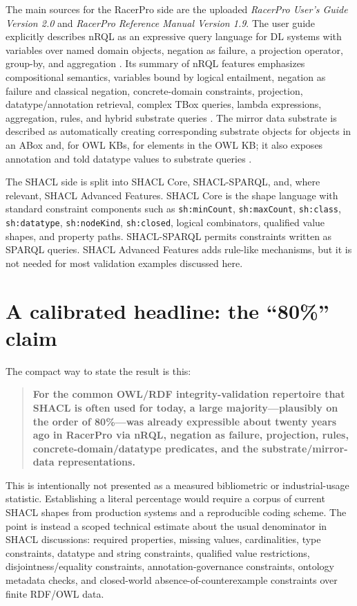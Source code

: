 \documentclass[11pt,letterpaper]{article}
\newcommand{\nrql}{nRQL}
\newcommand{\racer}{RacerPro}
\newcommand{\shacl}{SHACL}
\newcommand{\naf}{negation as failure}
\newcommand{\abox}{ABox}
\newcommand{\tbox}{TBox}
\newcommand{\owl}{OWL}
\begin{document}
The main sources for the \racer{} side are the uploaded \emph{RacerPro User's Guide Version 2.0} and \emph{RacerPro Reference Manual Version 1.9}. The user guide explicitly describes \nrql{} as an expressive query language for DL systems with variables over named domain objects, \naf{}, a projection operator, group-by, and aggregation \cite[p.~4]{racerug}. Its summary of \nrql{} features emphasizes compositional semantics, variables bound by logical entailment, \naf{} and classical negation, concrete-domain constraints, projection, datatype/annotation retrieval, complex \tbox{} queries, lambda expressions, aggregation, rules, and hybrid substrate queries \cite[pp.~81--84]{racerug}. The mirror data substrate is described as automatically creating corresponding substrate objects for objects in an \abox{} and, for \owl{} KBs, for elements in the \owl{} KB; it also exposes annotation and told datatype values to substrate queries \cite[pp.~137--143]{racerug}.

The \shacl{} side is split into \shacl{} Core, \shacl{}-SPARQL, and, where relevant, \shacl{} Advanced Features. \shacl{} Core is the shape language with standard constraint components such as \texttt{sh:minCount}, \texttt{sh:maxCount}, \texttt{sh:class}, \texttt{sh:datatype}, \texttt{sh:nodeKind}, \texttt{sh:closed}, logical combinators, qualified value shapes, and property paths. \shacl{}-SPARQL permits constraints written as SPARQL queries. \shacl{} Advanced Features adds rule-like mechanisms, but it is not needed for most validation examples discussed here.


\section{A calibrated headline: the ``80\%'' claim}\label{sec:calibrated-headline}

The compact way to state the result is this:

\begin{quote}
\textbf{For the common OWL/RDF integrity-validation repertoire that 
SHACL is often used for today, a large majority---plausibly on the order of 80\%---was already expressible about twenty years ago in RacerPro via 
\nrql{}, \naf{}, projection, rules, concrete-domain/datatype predicates, and the substrate/mirror-data representations.}
\end{quote}

This is intentionally not presented as a measured bibliometric or industrial-usage statistic. Establishing a literal percentage would require a corpus of current SHACL shapes from production systems and a reproducible coding scheme. The point is instead a scoped technical estimate about the usual denominator in SHACL discussions: required properties, missing values, cardinalities, type constraints, datatype and string constraints, qualified value restrictions, disjointness/equality constraints, annotation-governance constraints, ontology metadata checks, and closed-world absence-of-counterexample constraints over finite RDF/OWL data.
\end{document}
